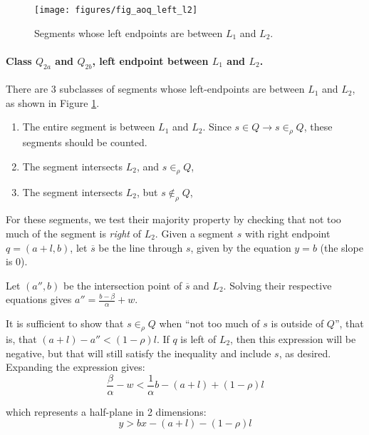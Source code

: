 
\begin{figure}[t]
\begin{center}
  \texttt{[image: figures/fig\_aoq\_left\_l2]}
  \caption{Segments whose left endpoints are between $L_1$ and $L_2$.}
  \label{fig:slabs:one:aoq_left_l2}
\end{center}
\end{figure}

\paragraph{Class $Q_{2a}$ and $Q_{2b}$, left endpoint between $L_1$ and $L_2$.}
There are 3 subclasses of segments whose left-endpoints are between $L_1$ and $L_2$, as shown in Figure \ref{fig:slabs:one:aoq_left_l2}.

\begin{enumerate}
 \item The entire segment is between $L_1$ and $L_2$. Since $s \in Q \rightarrow s \in_\rho Q$, these segments should be counted.

 \item The segment intersects $L_2$, and $s \in_\rho Q$,

 \item The segment intersects $L_2$, but $s \not \in_\rho Q$,

\end{enumerate}

For these segments, we test their majority property by checking that not too much of the segment is \emph{right} of $L_2$. Given a segment $s$ with right endpoint $q = (a+l,b)$, let $\overline{s}$ be the line through $s$, given by the equation $y = b$ (the slope is 0).

Let $(a'', b)$ be the intersection point of $\overline{s}$ and $L_2$. Solving their respective equations gives $a'' = \frac{b - \beta}{\alpha} + w$.

It is sufficient to show that $s \in_\rho Q$ when ``not too much of $s$ is outside of $Q$'', that is, that $(a + l) - a'' < (1 - \rho)l$. If $q$ is left of $L_2$, then this expression will be negative, but that will still satisfy the inequality and include $s$, as desired. Expanding the expression gives:
\[
\frac{\beta}{\alpha} - w < \frac{1}{\alpha} b - (a + l) + (1 - \rho)l 
\]

\noindent
which represents a half-plane in 2 dimensions:
\[
y > bx - (a + l) - (1 - \rho)l 
\]

